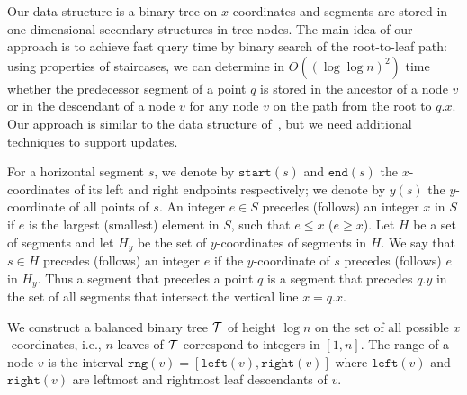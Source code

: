 \documentclass[10pt]{llncs}
\def\idtt#1{\ensuremath{\mathtt{#1}}}
\newcommand{\cT}{{\cal T}}
\newcommand{\leftb}{\idtt{left}}
\newcommand{\rightb}{\idtt{right}}
\newcommand{\rng}{\idtt{rng}}
\newcommand{\sleft}{\idtt{start}}
\newcommand{\sright}{\idtt{end}}
\begin{document}
Our data structure is a binary tree on $x$-coordinates and segments are stored 
in one-dimensional  secondary structures in  tree nodes. 
The main idea of our approach is to 
 achieve fast query time by binary search of the root-to-leaf 
path: using properties of staircases, we can determine in 
$O((\log \log n)^2)$ time whether the predecessor segment of a 
point $q$ is stored in the ancestor of a node $v$ or in the descendant 
of a node $v$ for any node $v$ on the path from the root to $q.x$. 
Our approach is similar to the data structure of~\cite{BKS95}, but we need 
additional techniques to support updates.

For a horizontal segment $s$, we denote by $\sleft(s)$ and $\sright(s)$ 
the $x$-coordinates of its left and right endpoints respectively;
we denote by $y(s)$ the $y$-coordinate of all points of $s$.
An integer $e\in S$ precedes (follows) an integer $x$ in $S$ if $e$ is 
the largest (smallest) element in $S$, such that $e\leq x$ ($e\geq x$).
Let $H$ be a set of segments and let $H_y$ be the set of $y$-coordinates 
of segments in $H$. We say that $s\in H$ precedes (follows) an integer 
$e$ if the $y$-coordinate of $s$ precedes (follows) $e$ in $H_y$.
Thus a segment that precedes a point $q$ is a segment that precedes 
$q.y$ in the set of all segments that intersect the vertical line $x=q.x$. 

We construct a balanced binary tree $\cT$ of height $\log n$ on the set of 
all possible $x$-coordinates, i.e., $n$ leaves of $\cT$ correspond to  
integers in $[1,n]$. The  range of a node $v$ is the interval 
$\rng(v)=[\leftb(v),\rightb(v)]$ where $\leftb(v)$ and $\rightb(v)$ are 
leftmost and rightmost leaf descendants of $v$.  
\end{document}
